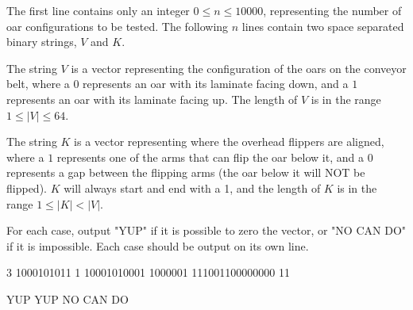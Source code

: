 \documentclass{article}
\begin{document}
\begin{inputDescription}
The first line contains only an integer $0 \leq n \leq 10000$, representing the number of oar configurations to be tested. The following $n$ lines contain two space separated binary strings, $V$ and $K$.

The string $V$ is a vector representing the configuration of the oars on the conveyor belt, where a $0$ represents an oar with its laminate facing down, and a $1$ represents an oar with its laminate facing up. The length of $V$ is in the range $1 \leq \left\vert{V}\right\vert \leq 64$.

The string $K$ is a vector representing where the overhead flippers are aligned, where a $1$ represents one of the arms that can flip the oar below it, and a $0$ represents a gap between the flipping arms (the oar below it will NOT be flipped). $K$ will always start and end with a 1, and the length of $K$ is in the range $1 \leq \left\vert{K}\right\vert < \left\vert{V}\right\vert$.

\end{inputDescription}

\begin{outputDescription}
For each case, output "YUP" if it is possible to zero the vector, or "NO CAN DO" if it is impossible. Each case should be output on its own line.

\end{outputDescription}

\begin{sampleInput}

3
1000101011 1
10001010001 1000001
111001100000000 11
\end{sampleInput}
\begin{sampleOutput}

YUP
YUP
NO CAN DO
\end{sampleOutput}
\end{document}
